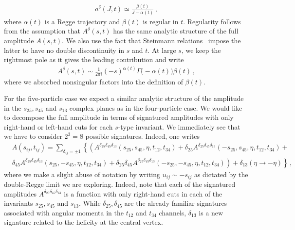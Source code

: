 \begin{align}
  a^{\delta}(J,t)\simeq \frac{\beta(t)}{J-\alpha(t)} \,,
\end{align}
where $\alpha(t)$ is a Regge trajectory and $\beta(t)$ is regular in $t$.
Regularity follows from the assumption that $A^{\delta}(s,t)$ has the same analytic structure of the full amplitude $A(s,t)$.
We also use the fact that Steinmann relations~\cite{SteinmannThesis} impose the latter to have no double discontinuity in $s$ and $t$.
At large $s$, we keep the rightmost pole as it gives the leading contribution and write
\begin{align}
  A^{\delta}(s,t)\sim \frac{1}{2\pi i}(-s)^{\alpha(t)} \Gamma\big(-\alpha(t)\big)\beta(t)\,,
\end{align}
where we   absorbed nonsingular factors into the definition of $\beta(t)$.

For the five-particle case  we expect a similar analytic structure of the amplitude in the $s_{25}, s_{45}$ and $s_{13}$ complex planes as in the four-particle case.
We would like to decompose the full amplitude in terms of signatured amplitudes with only right-hand or left-hand cuts for each $s$-type invariant.
We immediately see that we have to consider $2^3=8$ possible signatures.
Indeed, one writes
\begin{align}
  \label{eq:the8signatures}
   & A(s_{ij}, t_{ij})=  \sum_{\delta_{ij}=\pm 1} \left\{
  \left(A^{\delta_{25}\delta_{45}\delta_{13}}(s_{25},s_{45},\eta, t_{12},t_{34})+\delta_{25} A^{\delta_{25}\delta_{45}\delta_{13}} (-s_{25},s_{45},\eta, t_{12},t_{34}) + \right.\right. \\
   & \left.\left.  \delta_{45} A^{\delta_{25}\delta_{45}\delta_{13}} (s_{25},-s_{45},\eta, t_{12},t_{34}) +
  \delta_{25}\delta_{45} A^{\delta_{25}\delta_{45}\delta_{13}} (-s_{25},-s_{45},\eta, t_{12},t_{34})\right)+ \delta_{13} (\eta\to-\eta)
  \right\}\,,
  \nonumber
\end{align}
where we make a slight abuse of notation by writing $u_{ij}\sim-s_{ij}$ as dictated by the double-Regge limit we are exploring.
Indeed, note that each of the signatured amplitudes $A^{\delta_{25}\delta_{45}\delta_{13}}$ is a function with only right-hand cuts in each of the invariants $s_{25},s_{45}$ and $s_{13}$.
While $\delta_{25}, \delta_{45}$ are the already familiar signatures associated with angular momenta in the $t_{12}$ and $t_{34}$ channels,  $\delta_{13}$ is a new signature related to the helicity at the
central vertex.

